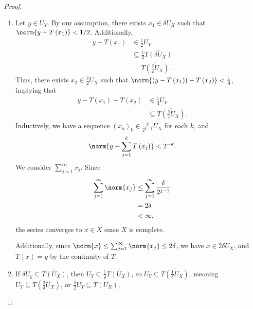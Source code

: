 \documentclass[10pt]{mypackage}
\begin{document}
  \begin{proof}\hfill
    \begin{enumerate}[(1)]
      \item Let $y\in U_Y$. By our assumption, there exists $x_1\in \delta U_X$ such that $\norm{y - T\left(x_1\right)} < 1/2$. Additionally,
        \begin{align*}
          y - T\left(x_1\right) &\in \frac{1}{2}U_Y\\
                                &\subseteq \frac{1}{2}\overline{T\left(\delta U_X\right)}\\
                                &= \overline{T\left(\frac{\delta}{2}U_X\right)}.
        \end{align*}
        Thus, there exists $x_2\in \frac{\delta}{2}U_X$ such that $\norm{\left(y-T\left(x_1\right)\right)-T\left(x_2\right)} < \frac{1}{4}$, implying that
        \begin{align*}
          y - T\left(x_1\right) -T\left(x_2\right) &\in \frac{1}{4}U_Y\\
                                                   &\subseteq \overline{T\left(\frac{\delta}{4}U_X\right)}.
        \end{align*}
        Inductively, we have a sequence $\left(x_k\right)_k\in \frac{\delta}{2^{k-1}}U_X$ for each $k$, and
        \begin{align*}
          \norm{y - \sum_{j=1}^{k}T\left(x_j\right)} < 2^{-k}.
        \end{align*}
        We consider $\sum_{j=1}^{\infty}x_j$. Since
        \begin{align*}
          \sum_{j=1}^{\infty}\norm{x_j} &\leq \sum_{j=1}^{\infty}\frac{\delta}{2^{j-1}}\\
                                        &= 2\delta\\
                                        &< \infty,
        \end{align*}
        the series converges to $x\in X$ since $X$ is complete.\newline

        Additionally, since $\norm{x}\leq \sum_{j=1}^{\infty}\norm{x_j} \leq 2\delta$, we have $x\in 2\delta U_X$, and $T\left(x\right) = y$ by the continuity of $T$.
      \item If $\delta U_y\subseteq \overline{T\left(U_X\right)}$, then $U_Y\subseteq \frac{1}{\delta}\overline{T\left(U_X\right)}$, so $U_Y\subseteq \overline{T\left(\frac{1}{\delta}U_X\right)}$, meaning $U_Y\subseteq T\left(\frac{2}{\delta}U_X\right)$, or $\frac{\delta}{2}U_Y\subseteq T\left(U_X\right)$.
    \end{enumerate}
  \end{proof}
\end{document}
